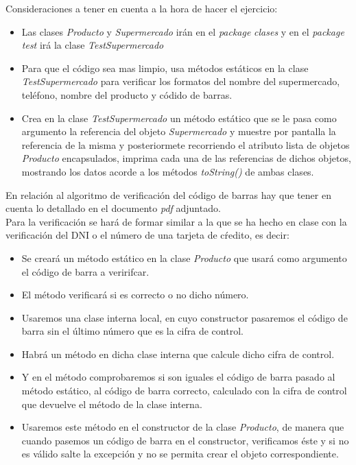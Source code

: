 \documentclass[addpoints,12pt]{exam}
\begin{document}
\begin{questions}
\begin{description}
\begin{itemize}
\begin{enumerate}
\end{enumerate}
\end{itemize}
\end{description}
Consideraciones a tener en cuenta a la hora de hacer el ejercicio:
\begin{itemize}
\item Las clases \emph{Producto} y \emph{Supermercado} irán en el \emph{package} \emph{clases} y en el \emph{package test} irá la clase \emph{TestSupermercado}
\item Para que el código sea mas limpio, usa métodos estáticos en la clase \emph{TestSupermercado} para verificar los formatos del nombre del supermercado, teléfono, nombre del producto y códido de barras.
\item Crea en la clase \emph{TestSupermercado} un método estático que se le pasa como argumento la referencia del objeto \emph{Supermercado} y muestre por pantalla la referencia de la misma y posteriormete recorriendo el atributo lista de objetos \emph{Producto} encapsulados, imprima cada una de las referencias de dichos objetos, mostrando los datos acorde a los métodos \emph{toString()} de ambas clases.
\end{itemize}
En relación al algoritmo de verificación del código de barras hay que tener en cuenta lo detallado en el documento \emph{pdf} adjuntado.\\
Para la verificación se hará de formar similar a la que se ha hecho en clase con la verificación del DNI o el número de una tarjeta de cŕedito, es decir:
\begin{itemize}
\item Se creará un método estático en la clase \emph{Producto} que usará como argumento el código de barra a veririfcar.
\item El método verificará si es correcto o no dicho número.
\item Usaremos una clase interna local, en cuyo constructor pasaremos el código de barra sin el último número que es la cifra de control.
\item Habrá un método en dicha clase interna que calcule dicho cifra de control.
\item Y en el método comprobaremos si son iguales el código de barra pasado al método estático, al código de barra correcto, calculado con la cifra de control que devuelve el método de la clase interna.
\item Usaremos este método en el constructor de la clase \emph{Producto}, de manera que cuando pasemos un código de barra en el constructor, verificamos éste y si no es válido salte la excepción y no se permita crear el objeto correspondiente.
\end{itemize}


\end{questions}
\end{document}
